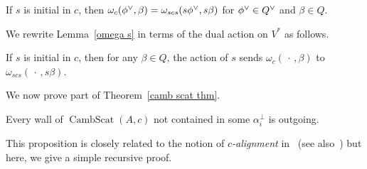 \documentclass[ALCO,ThmDefs,Unicode,epreuves]{cedram}
\DeclareMathOperator{\CambScat}{CambScat}
\newcommand{\newword}[1]{\emph{#1}}
\newcommand{\ck}{\spcheck}
\begin{document}
\begin{lemma}\label{omega s}
If $s$ is initial in $c$, then $\omega_c(\phi\ck,\beta)=\omega_{scs}(s\phi\ck,s\beta)$ for $\phi\ck\in Q\ck$ and $\beta\in Q$.
\end{lemma}

We rewrite Lemma~\ref{omega s} in terms of the dual action on $V^*$ as follows.

\begin{lemma}\label{omega s dual}
If $s$ is initial in $c$, then for any $\beta\in Q$, the action of $s$ sends $\omega_c(\,\cdot\,,\beta)$ to $\omega_{scs}(\,\cdot\,,s\beta)$.
\end{lemma}

We now prove part of Theorem~\ref{camb scat thm}.
\begin{prop}\label{camb out}
Every wall of $\CambScat(A,c)$ not contained in some $\alpha_i^\perp$ is outgoing.
\end{prop}
This proposition is closely related to the notion of \newword{$c$-alignment} in~\cite[Theorem~4.1]{sortable} (see also~\cite[Theorem~4.3]{typefree}) but here, we give a simple recursive proof.
\end{document}
